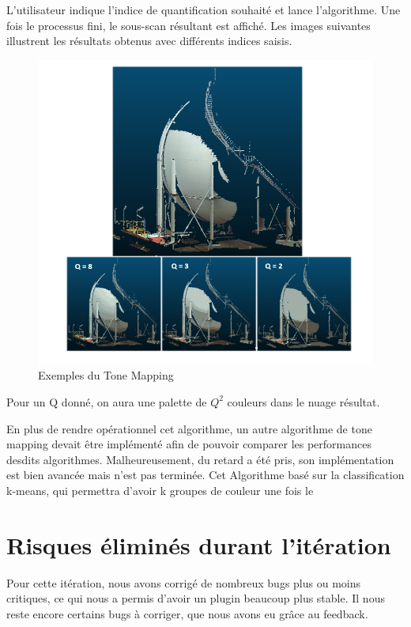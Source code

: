 \documentclass[12pt,titlepage,french]{article}
\begin{document}
L'utilisateur indique l'indice de quantification souhaité et lance l'algorithme. Une fois le processus fini, le sous-scan résultant est affiché. Les images suivantes illustrent les résultats obtenus avec différents indices saisis.
\begin{figure}[H]
 \caption{\label{} Exemples du Tone Mapping}
 \begin{center}
 \includegraphics[width=1\textwidth]{./img/ExpToonMapping.PNG}
  \end{center}
\end{figure}
Pour un Q donné, on aura une palette de $Q^2$ couleurs dans le nuage résultat.\newline

En plus de rendre opérationnel cet algorithme, un autre algorithme de tone mapping devait être implémenté afin de pouvoir comparer les performances desdits algorithmes. Malheureusement, du retard a été pris, son implémentation est bien avancée mais n'est pas terminée. Cet Algorithme basé sur la classification k-means, qui permettra d'avoir k groupes de couleur une fois le

\section{Risques éliminés durant l'itération}

Pour cette itération, nous avons corrigé de nombreux bugs plus ou moins critiques, ce qui nous a permis d'avoir un plugin beaucoup plus stable. Il nous reste encore certains bugs à corriger, que nous avons eu grâce au feedback.
\end{document}
